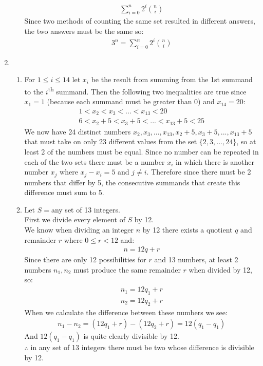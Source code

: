 \documentclass[11pt]{article}
\begin{document}
\begin{enumerate}[]
\begin{enumerate}[label=\alph*]
	\begin{gather}
		\sum_{i=0}^{n}2^{i}\binom{n}{i} \nonumber
	\end{gather}
Since two methods of counting the same set resulted in different answers, the two answers must be the same so:
	\begin{gather}
		3^n = \sum_{i=0}^{n}2^{i}\binom{n}{i} \nonumber
	\end{gather}
\end{enumerate}
\item
\begin{enumerate}[label=\alph*]
\item
	For $1\leq i \leq 14$ let $x_i$ be the result from summing from the 1st summand to the $i$\textsuperscript{th} summand. Then the following two inequalities are true since $x_1=1$ (because each summand must be greater than 0) and $x_{14}=20$:
	\begin{gather}
		1<x_2<x_3<...<x_{13}<20 \nonumber \\
		6<x_2+5<x_3+5<...<x_{13}+5<25 \nonumber
	\end{gather}
	We now have 24 distinct numbers $x_2,x_3,...,x_{13},x_2+5,x_3+5,...,x_{13}+5$ that must take on only 23 different values from the set $\{2,3,...,24\}$, so at least 2 of the numbers must be equal. Since no number can be repeated in each of the two sets there must be a number $x_i$ in which there is another number $x_j$ where $x_j -x_i = 5$ and $j \neq i$. Therefore since there must be 2 numbers that differ by 5, the consecutive summands that create this difference must sum to 5.
\item
	Let $S=$any set of 13 integers.\\
	First we divide every element of $S$ by 12.\\
	We know when dividing an integer $n$ by 12 there exists a quotient $q$ and remainder $r$ where $0\leq r < 12$ and:
	\begin{gather}
		n=12q+r \nonumber 
	\end{gather}
	Since there are only 12 possibilities for $r$ and 13 numbers, at least 2 numbers $n_1,n_2$ must produce the same remainder $r$ when divided by 12, so:
	\begin{gather}
		n_1 =12q_1+r \nonumber \\
		n_2 =12q_2+r \nonumber
	\end{gather}
	When we calculate the difference between these numbers we see:
	\begin{gather}
		n_1-n_2=(12q_1+r) - (12q_2+r) = 12(q_1-q_1) \nonumber
	\end{gather}
	And $12(q_1-q_1)$ is quite clearly divisible by 12.\\
	$\therefore$ in any set of 13 integers there must be two whose difference is divisible by 12.
\end{enumerate}

\end{enumerate}
\end{document}
